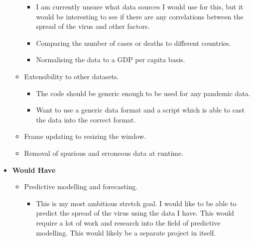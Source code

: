 \documentclass{report}
\begin{document}
\begin{itemize}
\begin{itemize}
        \begin{itemize}
            \item I am currently unsure what data sources I would use for this, but it would be interesting to see if there are any correlations between the spread of the virus and other factors.
            \item Comparing the number of cases or deaths to different countries.
            \item Normalising the data to a GDP per capita basis.
        \end{itemize}
        \item Extensibility to other datasets.
        \begin{itemize}
            \item The code should be generic enough to be used for any pandemic data.
            \item Want to use a generic data format and a script which is able to cast the data into the correct format.
        \end{itemize}
        \item Frame updating to resizing the window.
        \item Removal of spurious and erroneous data at runtime.
    \end{itemize}
    \item \textbf{\Large{Would Have}}
    \begin{itemize}
        \item Predictive modelling and forecasting.
        \begin{itemize}
            \item This is my most ambitious stretch goal. I would like to be able to predict the spread of the virus using the data I have. This would require a lot of work and research into the field of predictive modelling. This would likely be a separate project in itself.
        \end{itemize}
    \end{itemize}
\end{itemize}
\newpage
\end{document}
